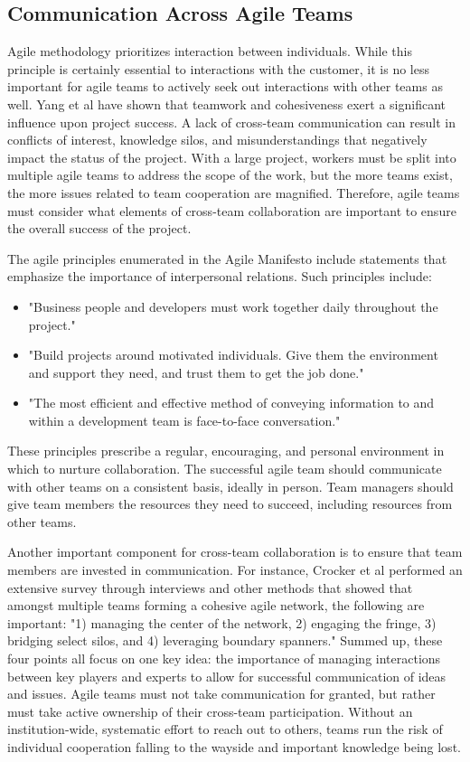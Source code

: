\subsection{Communication Across Agile Teams}

Agile methodology prioritizes interaction between individuals.
While this principle is certainly essential to interactions with the customer, it is no less important for agile teams to actively seek out interactions with other teams as well.
Yang et al\cite{YANG} have shown that teamwork and cohesiveness exert a significant influence upon project success.
A lack of cross-team communication can result in conflicts of interest, knowledge silos, and misunderstandings that negatively impact the status of the project.
With a large project, workers must be split into multiple agile teams to address the scope of the work, but the more teams exist, the more issues related to team cooperation are magnified.
Therefore, agile teams must consider what elements of cross-team collaboration are important to ensure the overall success of the project.

The agile principles enumerated in the Agile Manifesto include statements that emphasize the importance of interpersonal relations. Such principles include:
\begin{itemize}
\item "Business people and developers must work together daily throughout the project."
\item "Build projects around motivated individuals. Give them the environment and support they need, and trust them to get the job done."
\item "The most efficient and effective method of conveying information to and within a development team is face-to-face conversation." \cite{AgileMani}
\end{itemize}

These principles prescribe a regular, encouraging, and personal environment in which to nurture collaboration.
The successful agile team should communicate with other teams on a consistent basis, ideally in person.
Team managers should give team members the resources they need to succeed, including resources from other teams.

Another important component for cross-team collaboration is to ensure that team members are invested in communication.
For instance, Crocker et al\cite{HBR} performed an extensive survey through interviews and other methods that showed that amongst multiple teams forming a cohesive agile network, the following are important: "1) managing the center of the network, 2) engaging the fringe, 3) bridging select silos, and 4) leveraging boundary spanners."
Summed up, these four points all focus on one key idea: the importance of managing interactions between key players and experts to allow for successful communication of ideas and issues.
Agile teams must not take communication for granted, but rather must take active ownership of their cross-team participation.
Without an institution-wide, systematic effort to reach out to others, teams run the risk of individual cooperation falling to the wayside and important knowledge being lost.

